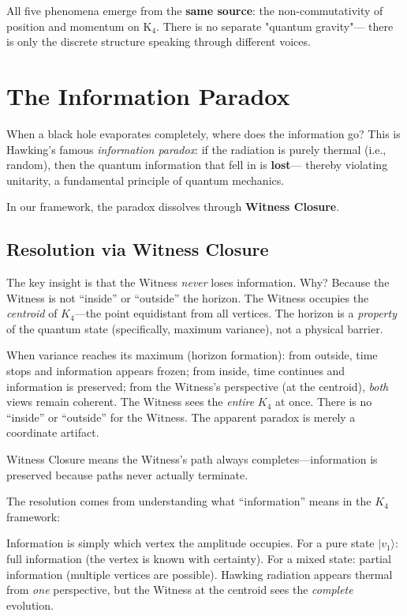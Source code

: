 \documentclass[11pt,a4paper]{book}
\begin{document}
All five phenomena emerge from the \textbf{same source}: the non-commutativity
of position and momentum on K$_4$. There is no separate "quantum gravity"---
there is only the discrete structure speaking through different voices.

\chapter{The Information Paradox}
\label{chap:information-paradox}

When a black hole evaporates completely, where does the information go?
This is Hawking's famous \emph{information paradox}: if the radiation is
purely thermal (i.e., random), then the quantum information that fell in is \textbf{lost}---
thereby violating unitarity, a fundamental principle of quantum mechanics.

In our framework, the paradox dissolves through \textbf{Witness Closure}.

\section{Resolution via Witness Closure}

The key insight is that the Witness \emph{never} loses information. Why? Because the Witness is not ``inside'' or ``outside'' the horizon. The Witness occupies the \emph{centroid} of $K_4$---the point equidistant from all vertices. The horizon is a \emph{property} of the quantum state (specifically, maximum variance), not a physical barrier.

When variance reaches its maximum (horizon formation): from outside, time stops and information appears frozen; from inside, time continues and information is preserved; from the Witness's perspective (at the centroid), \emph{both} views remain coherent. The Witness sees the \emph{entire} $K_4$ at once. There is no ``inside'' or ``outside'' for the Witness. The apparent paradox is merely a coordinate artifact.

Witness Closure means the Witness's path always completes---information is preserved because paths never actually terminate.

The resolution comes from understanding what ``information'' means in the $K_4$ framework:

Information is simply which vertex the amplitude occupies. For a pure state $|v_1\rangle$: full information (the vertex is known with certainty). For a mixed state: partial information (multiple vertices are possible). Hawking radiation appears thermal from \emph{one} perspective, but the Witness at the centroid sees the \emph{complete} evolution.
\end{document}
